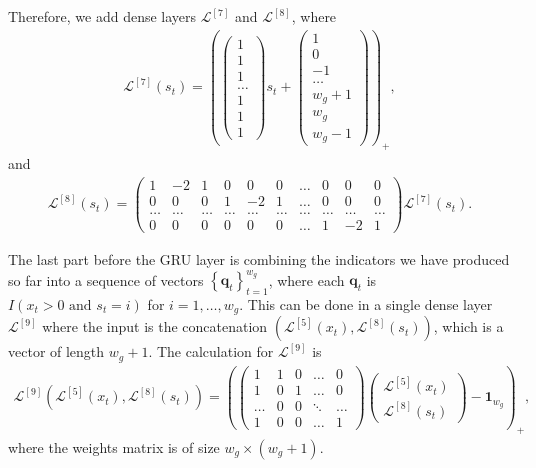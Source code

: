 \documentclass{somasmsc}
\begin{document}
Therefore, we add dense layers $\mathcal{L}^{\left[7\right]}$ and $\mathcal{L}^{\left[8\right]}$, where
\begin{align*}
\mathcal{L}^{\left[7\right]}\left(s_t\right) = \left(
\begin{pmatrix}
    1 \\
    1 \\
    1 \\
    \dots \\
    1 \\
    1 \\
    1
\end{pmatrix}
s_t +
\begin{pmatrix}
    1 \\
    0 \\
    -1 \\
    \dots \\
    w_g + 1 \\
    w_g \\
    w_g - 1
\end{pmatrix}\right)_+,
\end{align*}
and
\begin{align*}
\mathcal{L}^{\left[8\right]}\left(s_t\right) =
\begin{pmatrix}
    1 & -2 & 1 & 0 & 0 & 0 & \dots & 0 & 0 & 0 \\
    0 & 0 & 0 & 1 & -2 & 1 & \dots & 0 & 0 & 0 \\
    \dots & \dots & \dots & \dots & \dots & \dots & \dots & \dots & \dots & \dots \\
    0 & 0 & 0 & 0 & 0 & 0 &\dots & 1 & -2 & 1
\end{pmatrix}
\mathcal{L}^{\left[7\right]}\left(s_t\right).
\end{align*}

The last part before the GRU layer is combining the indicators we have produced so far into a sequence of vectors $\left\{\pmb{q}_t\right\}_{t=1}^{w_g}$, where each $\pmb{q}_t$ is $I\left(x_t > 0 \text{ and } s_t = i\right)$ for $i = 1, \dots, w_g$. This can be done in a single dense layer $\mathcal{L}^{\left[9\right]}$ where the input is the concatenation $\left(\mathcal{L}^{\left[5\right]}\left(x_t\right), \mathcal{L}^{\left[8\right]}\left(s_t\right)\right)$, which is a vector of length $w_g + 1$. The calculation for $\mathcal{L}^{\left[9\right]}$ is
\begin{align*}
\mathcal{L}^{\left[9\right]}\left(\mathcal{L}^{\left[5\right]}\left(x_t\right), \mathcal{L}^{\left[8\right]}\left(s_t\right)\right) = \left(
\begin{pmatrix}
    1 & 1 & 0 & \dots & 0 \\
    1 & 0 & 1 & \dots & 0 \\
    \dots & 0 & 0 & \ddots & \dots \\
    1 & 0 & 0 & \dots & 1
\end{pmatrix}
\begin{pmatrix}
    \mathcal{L}^{\left[5\right]}\left(x_t\right) \\
    \mathcal{L}^{\left[8\right]}\left(s_t\right)
\end{pmatrix}
- \mathbf{1}_{w_g}\right)_+,
\end{align*}
where the weights matrix is of size $w_g \times \left(w_g + 1\right)$.
\end{document}

